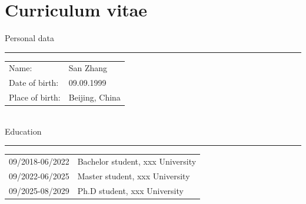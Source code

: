 \documentclass[a4paper,11pt,UTF8,openright]{book}
\begin{document}
\listoffigures

\listoftables

\chapter*{Curriculum vitae}

\noindent Personal data

\noindent\rule{\textwidth}{0.4pt}

\vskip 0.1in

\begin{tabular}{p{}p{}}
  Name: & San Zhang \\
  Date of birth: & 09.09.1999 \\
  Place of birth: & Beijing, China \\
\end{tabular} \\

\noindent Education

\noindent\rule{\textwidth}{0.4pt}

\vskip 0.1in

\begin{tabular}{p{}p{}}
  09/2018-06/2022 & Bachelor student, xxx University \\
  09/2022-06/2025 & Master student, xxx University \\
  09/2025-08/2029 & Ph.D student, xxx University \\
\end{tabular} \\
\end{document}
